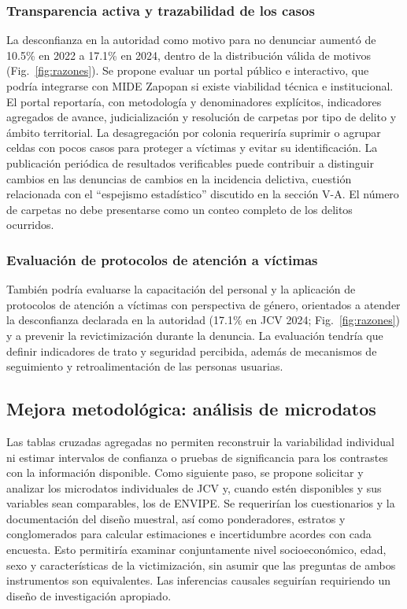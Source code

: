 \documentclass[10pt,twocolumn,letterpaper]{article}
\begin{document}
\subsubsection{Transparencia activa y trazabilidad de los casos}

La desconfianza en la autoridad como motivo para no denunciar aumentó
de 10.5\% en 2022 a 17.1\% en 2024, dentro de la distribución válida de
motivos (Fig.~\ref{fig:razones}). Se propone evaluar un portal público
e interactivo, que podría integrarse con MIDE Zapopan si existe
viabilidad técnica e institucional. El portal reportaría, con
metodología y denominadores explícitos, indicadores agregados de avance,
judicialización y resolución de carpetas por tipo de delito y ámbito
territorial. La desagregación por colonia requeriría suprimir o agrupar
celdas con pocos casos para proteger a víctimas y evitar su
identificación. La publicación periódica de resultados verificables
puede contribuir a distinguir cambios en las denuncias de cambios en la
incidencia delictiva, cuestión relacionada con el ``espejismo
estadístico'' discutido en la sección V-A. El número de carpetas no debe
presentarse como un conteo completo de los delitos ocurridos.

\subsubsection{Evaluación de protocolos de atención a víctimas}

También podría evaluarse la capacitación del personal y la aplicación
de protocolos de atención a víctimas con perspectiva de género,
orientados a atender la desconfianza declarada en la autoridad (17.1\%
en JCV 2024; Fig.~\ref{fig:razones}) y a prevenir la revictimización
durante la denuncia. La evaluación tendría que definir indicadores de
trato y seguridad percibida, además de mecanismos de seguimiento y
retroalimentación de las personas usuarias.

\subsection{Mejora metodológica: análisis de microdatos}

Las tablas cruzadas agregadas no permiten reconstruir la variabilidad
individual ni estimar intervalos de confianza o pruebas de
significancia para los contrastes con la información disponible. Como
siguiente paso, se propone solicitar y analizar los microdatos
individuales de JCV y, cuando estén disponibles y sus variables sean
comparables, los de ENVIPE. Se requerirían los cuestionarios y la
documentación del diseño muestral, así como ponderadores, estratos y
conglomerados para calcular estimaciones e incertidumbre acordes con
cada encuesta. Esto permitiría examinar conjuntamente nivel
socioeconómico, edad, sexo y características de la victimización, sin
asumir que las preguntas de ambos instrumentos son equivalentes. Las
inferencias causales seguirían requiriendo un diseño de investigación
apropiado.
\end{document}
